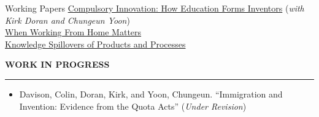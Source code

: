 \documentclass{resume} %
\begin{document}
\begin{rSection}{Working Papers}
\href{https://colindavison.github.io/working_papers/compulsory_innovation/compulsory_innovation.pdf}{Compulsory Innovation: How Education Forms Inventors} (\textit{with Kirk Doran and Chungeun Yoon})\\
\href{https://colindavison.github.io/working_papers/wfh/when_working.pdf}{When Working From Home Matters} \\
\href{https://colindavison.github.io/working_papers/knowledge/knowledge_spillovers.pdf}{Knowledge Spillovers of Products and Processes} 
\end{rSection}	


\sectionskip
\MakeUppercase{\textbf{Work in Progress}}
\sectionlineskip
\hrule
\begin{itemize}[leftmargin=1.5em]
\setlength\itemsep{-0.2em}
	\item [] Davison, Colin, Doran, Kirk, and Yoon, Chungeun. ``Immigration and Invention: Evidence from the Quota Acts'' (\textit{Under Revision}) 
\end{itemize}

	
\end{document}
